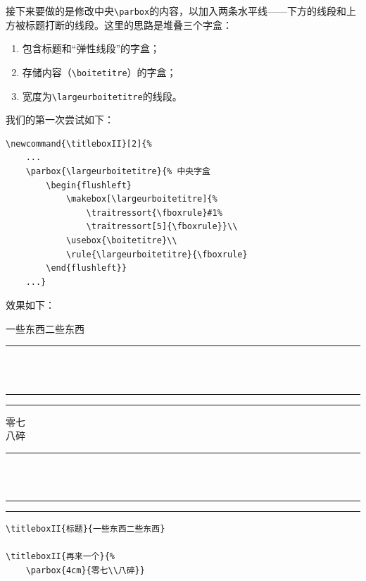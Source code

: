 接下来要做的是修改中央\verb|\parbox|的内容，以加入两条水平线——下方的线段和上方被标题打断的线段。这里的思路是堆叠三个字盒：

\begin{enumerate}
    \item 包含标题和“弹性线段”的字盒；
    \item 存储内容（\verb|\boitetitre|）的字盒；
    \item 宽度为\verb|\largeurboitetitre|的线段。
\end{enumerate}

我们的第一次尝试如下：

\begin{dmd}
\begin{verbatim}
\newcommand{\titleboxII}[2]{% 
    ...
    \parbox{\largeurboitetitre}{% 中央字盒
        \begin{flushleft}
            \makebox[\largeurboitetitre]{% 
                \traitressort{\fboxrule}#1% 
                \traitressort[5]{\fboxrule}}\\
            \usebox{\boitetitre}\\
            \rule{\largeurboitetitre}{\fboxrule}
        \end{flushleft}}
    ...}\end{verbatim}
\end{dmd}

\newcommand{\titleboxII}[2]{%
  \begin{lrbox}{\boitetitre}%
    \kern\fboxsep#2\kern\fboxsep
  \end{lrbox}
  \settowidth{\largeurboitetitre}{\usebox{\boitetitre}}%
  \settoheight{\hauteurboitetitre}{\usebox{\boitetitre}}%
  \settodepth{\tempdim}{\usebox{\boitetitre}}%
  \addtolength{\hauteurboitetitre}{\tempdim+2\fboxrule+2\fboxsep}%
  \parbox{\fboxrule}{%
    \rule{\fboxrule}{\hauteurboitetitre}}%
  \parbox{\largeurboitetitre}{%
    \begin{flushleft}
      \makebox[\largeurboitetitre]{%
        \traitressort{\fboxrule}#1\traitressort[5]{\fboxrule}}\\
      \usebox{\boitetitre}\\
      \rule{\largeurboitetitre}{\fboxrule}
    \end{flushleft}}%
  \parbox{\fboxrule}{%
    \rule{\fboxrule}{\hauteurboitetitre}}}

效果如下：

\begin{codelist}[10.20]{
    \titleboxII{标题}{一些东西二些东西}

    \titleboxII{再来一个}{%
        \parbox{4cm}{零七\\八碎}}
}
\begin{verbatim}
\titleboxII{标题}{一些东西二些东西}

\titleboxII{再来一个}{%
    \parbox{4cm}{零七\\八碎}}\end{verbatim}
\end{codelist}

